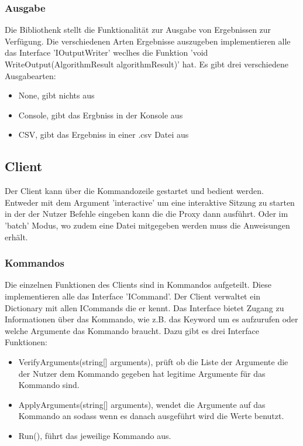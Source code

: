 \subsubsection{Ausgabe}

Die Bibliothenk stellt die Funktionalität zur Ausgabe von Ergebnissen zur Verfügung. Die verschiedenen Arten Ergebnisse auszugeben implementieren alle
das Interface 'IOutputWriter' weclhes die Funktion 'void WriteOutput(AlgorithmResult algorithmResult)' hat. Es gibt drei verschiedene Ausgabearten:

\begin{itemize}
  \item None, gibt nichts aus
  \item Console, gibt das Ergbniss in der Konsole aus
  \item CSV, gibt das Ergebniss in einer .csv Datei aus
\end{itemize}


\subsection{Client}

Der Client kann über die Kommandozeile gestartet und bedient werden. Entweder mit dem Argument 'interactive' um eine interaktive Sitzung zu starten
in der der Nutzer Befehle eingeben kann die die Proxy dann ausführt. Oder im 'batch' Modus, wo zudem eine Datei mitgegeben werden muss die Anweisungen erhält.

\subsubsection{Kommandos}

Die einzelnen Funktionen des Clients sind in Kommandos aufgeteilt.
Diese implementieren alle das Interface 'ICommand'. Der Client verwaltet ein Dictionary mit allen ICommands die er kennt.
Das Interface bietet Zugang zu Informationen über das Kommando, wie z.B. das Keyword um es aufzurufen oder welche Argumente das Kommando braucht.
Dazu gibt es drei Interface Funktionen:

\begin{itemize}
  \item VerifyArguments(string[] arguments), prüft ob die Liste der Argumente die der Nutzer dem Kommando gegeben hat legitime Argumente für das Kommando sind.
  \item ApplyArguments(string[] arguments), wendet die Argumente auf das Kommando an sodass wenn es danach ausgeführt wird die Werte benutzt.
  \item Run(), führt das jeweilige Kommando aus.
\end{itemize}

